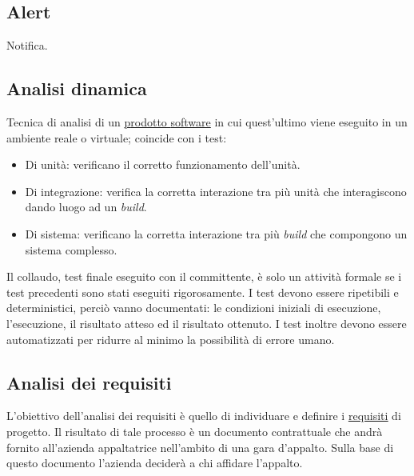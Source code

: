 





\copertina


\tableofcontents


	\newpage	


	\subsection{Alert}
	\label{sec:alter}
	Notifica.


	\subsection{Analisi dinamica}
	\label{sec:analisidinamica}
	Tecnica di analisi di un \underline{\hyperref[sec:prodottosoftware]prodotto {software}} in cui quest'ultimo viene eseguito in un ambiente reale o virtuale; coincide con i test:
	\begin{itemize}
		\item Di unità: verificano il corretto funzionamento dell'unità.
		\item Di integrazione: verifica la corretta interazione tra più unità che interagiscono dando luogo ad un \emph{build}.
		\item Di sistema: verificano la corretta interazione tra più \emph{build} che compongono un sistema complesso.
	\end{itemize}
	Il collaudo, test finale eseguito con il committente, è solo un attività formale se i test precedenti sono stati eseguiti rigorosamente. I test devono essere ripetibili e deterministici, perciò vanno documentati: le condizioni iniziali di esecuzione, l'esecuzione, il risultato atteso ed il risultato ottenuto. I test inoltre devono essere automatizzati per ridurre al minimo la possibilità di errore umano.


	\subsection{Analisi dei requisiti}
	\label{sec:analisirequisiti}
	L'obiettivo dell'analisi dei requisiti è quello di individuare e definire i \underline{\hyperref[sec:requisito]{requisiti}} di progetto. Il risultato di tale processo è un documento contrattuale che andrà fornito all'azienda appaltatrice nell'ambito di una gara d'appalto. Sulla base di questo documento l'azienda deciderà a chi affidare l'appalto.


